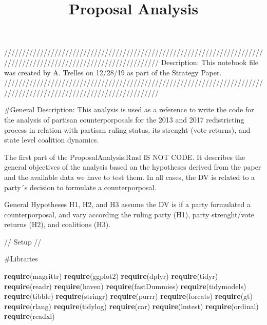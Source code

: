 \documentclass[
]{article}
\title{Proposal Analysis}
\author{}
\date{\vspace{-2.5em}}
\newenvironment{Shaded}{\begin{snugshade}}{\end{snugshade}}
\newcommand{\KeywordTok}[1]{\textcolor[rgb]{0.13,0.29,0.53}{\textbf{#1}}}
\newcommand{\NormalTok}[1]{#1}
\begin{document}
\maketitle

///////////////////////////////////////////////////////////////////////////////////////////////////////////////////
Description: This notebook file was created by A. Trelles on 12/28/19 as
part of the Strategy Paper.
///////////////////////////////////////////////////////////////////////////////////////////////////////////////////

\#General Description: This analysis is used as a reference to write the
code for the analysis of partisan counterporposals for the 2013 and 2017
redistricting process in relation with partisan ruling status, its
strenght (vote returns), and state level coalition dynamics.

The first part of the ProposalAnalysis.Rmd IS NOT CODE. It describes the
general objectives of the analysis based on the hypotheses derived from
the paper and the available data we have to test them. In all cases, the
DV is related to a party´s decision to formulate a counterporposal.

General Hypotheses H1, H2, and H3 assume the DV is if a party formulated
a counterporposal, and vary according the ruling party (H1), party
strenght/vote returns (H2), and coalitions (H3).

// Setup //

\#Libraries

\begin{Shaded}
\begin{Highlighting}[]
\KeywordTok{require}\NormalTok{(magrittr)}
\KeywordTok{require}\NormalTok{(ggplot2)}
\KeywordTok{require}\NormalTok{(dplyr)}
\KeywordTok{require}\NormalTok{(tidyr)}
\KeywordTok{require}\NormalTok{(readr)}
\KeywordTok{require}\NormalTok{(haven)}
\KeywordTok{require}\NormalTok{(fastDummies)}
\KeywordTok{require}\NormalTok{(tidymodels)}
\KeywordTok{require}\NormalTok{(tibble)}
\KeywordTok{require}\NormalTok{(stringr)}
\KeywordTok{require}\NormalTok{(purrr)}
\KeywordTok{require}\NormalTok{(forcats)}
\KeywordTok{require}\NormalTok{(gt)}
\KeywordTok{require}\NormalTok{(rlang)}
\KeywordTok{require}\NormalTok{(tidylog)}
\KeywordTok{require}\NormalTok{(car)}
\KeywordTok{require}\NormalTok{(lmtest)}
\KeywordTok{require}\NormalTok{(ordinal)}
\KeywordTok{require}\NormalTok{(readxl)}
\end{Highlighting}
\end{Shaded}
\end{document}
